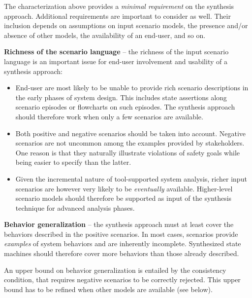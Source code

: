 The characterization above provides a \emph{minimal requirement} on the synthesis approach. Additional requirements are important to consider as well. Their inclusion depends on assumptions on input scenario models, the presence and/or absence of other models, the availability of an end-user, and so on.

\begin{description}

\item{\textbf{Richness of the scenario language}} -- the richness of the input scenario language is an important issue for end-user involvement and usability of a synthesis approach:

\begin{itemize}

\item End-user are most likely to be unable to provide rich scenario descriptions in the early phases of system design. This includes state assertions along scenario episodes or flowcharts on such episodes. The synthesis approach should therefore work when only a few scenarios are available. 

\item Both positive and negative scenarios should be taken into account. Negative scenarios are not uncommon among the examples provided by stakeholders. One reason is that they naturally illustrate violations of safety goals while being easier to specify than the latter.

\item Given the incremental nature of tool-supported system analysis, richer input scenarios are however very likely to be \emph{eventually} available. Higher-level scenario models should therefore be supported as input of the synthesis technique for advanced analysis phases.

\end{itemize}

\item{\textbf{Behavior generalization}} -- the synthesis approach must at least cover the behaviors described in the positive scenarios. In most cases, scenarios provide \emph{examples} of system behaviors and are inherently incomplete. Synthesized state machines should therefore cover more behaviors than those already described. 

An upper bound on behavior generalization is entailed by the consistency condition, that requires negative scenarios to be correctly rejected. This upper bound has to be refined when other models are available (see below).


\end{description}
